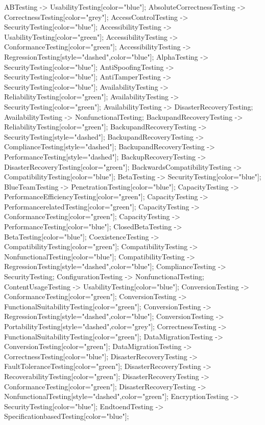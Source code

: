 \documentclass{article}
\begin{document}
{ABTesting -> UsabilityTesting[color="blue"];
AbsoluteCorrectnessTesting -> CorrectnessTesting[color="grey"];
AccessControlTesting -> SecurityTesting[color="blue"];
AccessibilityTesting -> UsabilityTesting[color="green"];
AccessibilityTesting -> ConformanceTesting[color="green"];
AccessibilityTesting -> RegressionTesting[style="dashed",color="blue"];
AlphaTesting -> SecurityTesting[color="blue"];
AntiSpoofingTesting -> SecurityTesting[color="blue"];
AntiTamperTesting -> SecurityTesting[color="blue"];
AvailabilityTesting -> ReliabilityTesting[color="green"];
AvailabilityTesting -> SecurityTesting[color="green"];
AvailabilityTesting -> DisasterRecoveryTesting;
AvailabilityTesting -> NonfunctionalTesting;
BackupandRecoveryTesting -> ReliabilityTesting[color="green"];
BackupandRecoveryTesting -> SecurityTesting[style="dashed"];
BackupandRecoveryTesting -> ComplianceTesting[style="dashed"];
BackupandRecoveryTesting -> PerformanceTesting[style="dashed"];
BackupRecoveryTesting -> DisasterRecoveryTesting[color="green"];
BackwardsCompatibilityTesting -> CompatibilityTesting[color="blue"];
BetaTesting -> SecurityTesting[color="blue"];
BlueTeamTesting -> PenetrationTesting[color="blue"];
CapacityTesting -> PerformanceEfficiencyTesting[color="green"];
CapacityTesting -> PerformancerelatedTesting[color="green"];
CapacityTesting -> ConformanceTesting[color="green"];
CapacityTesting -> PerformanceTesting[color="blue"];
ClosedBetaTesting -> BetaTesting[color="blue"];
CoexistenceTesting -> CompatibilityTesting[color="green"];
CompatibilityTesting -> NonfunctionalTesting[color="blue"];
CompatibilityTesting -> RegressionTesting[style="dashed",color="blue"];
ComplianceTesting -> SecurityTesting;
ConfigurationTesting -> NonfunctionalTesting;
ContentUsageTesting -> UsabilityTesting[color="blue"];
ConversionTesting -> ConformanceTesting[color="green"];
ConversionTesting -> FunctionalSuitabilityTesting[color="green"];
ConversionTesting -> RegressionTesting[style="dashed",color="blue"];
ConversionTesting -> PortabilityTesting[style="dashed",color="grey"];
CorrectnessTesting -> FunctionalSuitabilityTesting[color="green"];
DataMigrationTesting -> ConversionTesting[color="green"];
DataMigrationTesting -> CorrectnessTesting[color="blue"];
DisasterRecoveryTesting -> FaultToleranceTesting[color="green"];
DisasterRecoveryTesting -> RecoverabilityTesting[color="green"];
DisasterRecoveryTesting -> ConformanceTesting[color="green"];
DisasterRecoveryTesting -> NonfunctionalTesting[style="dashed",color="green"];
EncryptionTesting -> SecurityTesting[color="blue"];
EndtoendTesting -> SpecificationbasedTesting[color="blue"];
}
\end{document}
